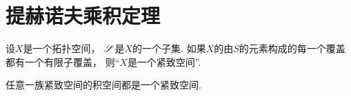 \section{提赫诺夫乘积定理}
\begin{theorem}
设\(X\)是一个拓扑空间，
\(\S\)是\(X\)的一个子集.
如果\(X\)的由\(S\)的元素构成的每一个覆盖都有一个有限子覆盖，
则“\(X\)是一个紧致空间”.
\end{theorem}

\begin{theorem}[提赫诺夫乘积定理]
任意一族紧致空间的积空间都是一个紧致空间.
\end{theorem}
